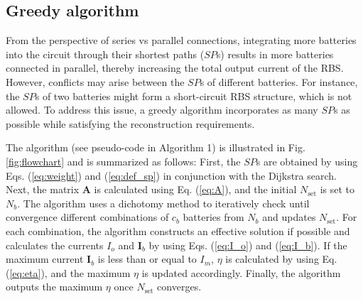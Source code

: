 \documentclass{article}
\begin{document}
\subsection{Greedy algorithm}\label{subsec:greedy_solution}

From the perspective of series vs parallel connections, integrating more batteries into the circuit through their shortest paths ($SP$s) results in more batteries connected in parallel, thereby increasing the total output current of the RBS.
However, conflicts may arise between the $SP$s of different batteries. 
For instance, the $SP$s of two batteries might form a short-circuit RBS structure, which is not allowed. 
To address this issue, a greedy algorithm incorporates as many $SP$s as possible while satisfying the reconstruction requirements.

The algorithm (see pseudo-code in Algorithm 1) is illustrated in Fig. \ref{fig:flowchart} and is summarized as follows:
First, the $SP$s are obtained by using Eqs. (\ref{eq:weight}) and (\ref{eq:def_sp}) in conjunction with the Dijkstra search. 
Next, the matrix $\bm{A}$ is calculated using Eq. (\ref{eq:A}), and the initial $N_{\text{set}}$ is set to $N_b$. 
The algorithm uses a dichotomy method to iteratively check until convergence different combinations of $c_b$ batteries from $N_b$ and updates $N_{\text{set}}$. 
For each combination, the algorithm constructs an effective solution if possible and calculates the currents $I_o$ and $\bm{I}_b$ by using Eqs. (\ref{eq:I_o}) and (\ref{eq:I_b}). 
If the maximum current $\bm{I}_b$ is less than or equal to $I_m$, $\eta$ is calculated by using Eq. (\ref{eq:eta}), and the maximum $\eta$ is updated accordingly. 
Finally, the algorithm outputs the maximum $\eta$ once $N_{\text{set}}$ converges.
\end{document}
